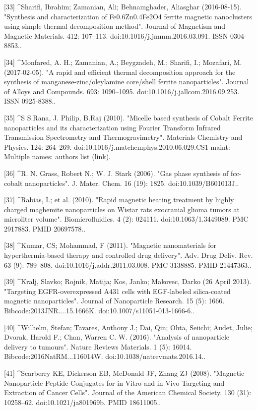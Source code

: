 [33]
^Sharifi, Ibrahim; Zamanian, Ali; Behnamghader, Aliasghar (2016-08-15). "Synthesis and characterization of Fe0.6Zn0.4Fe2O4 ferrite magnetic nanoclusters using simple thermal decomposition method". Journal of Magnetism and Magnetic Materials. 412: 107–113. doi:10.1016/j.jmmm.2016.03.091. ISSN 0304-8853..

[34]
^Monfared, A. H.; Zamanian, A.; Beygzadeh, M.; Sharifi, I.; Mozafari, M. (2017-02-05). "A rapid and efficient thermal decomposition approach for the synthesis of manganese-zinc/oleylamine core/shell ferrite nanoparticles". Journal of Alloys and Compounds. 693: 1090–1095. doi:10.1016/j.jallcom.2016.09.253. ISSN 0925-8388..

[35]
^S S.Rana, J. Philip, B.Raj (2010). "Micelle based synthesis of Cobalt Ferrite nanoparticles and its characterization using Fourier Transform Infrared Transmission Spectrometry and Thermogravimetry". Materials Chemistry and Physics. 124: 264–269. doi:10.1016/j.matchemphys.2010.06.029.CS1 maint: Multiple names: authors list (link).

[36]
^R. N. Grass, Robert N.; W. J. Stark (2006). "Gas phase synthesis of fcc-cobalt nanoparticles". J. Mater. Chem. 16 (19): 1825. doi:10.1039/B601013J..

[37]
^Rabias, I.; et al. (2010). "Rapid magnetic heating treatment by highly charged maghemite nanoparticles on Wistar rats exocranial glioma tumors at microliter volume". Biomicrofluidics. 4 (2): 024111. doi:10.1063/1.3449089. PMC 2917883. PMID 20697578..

[38]
^Kumar, CS; Mohammad, F (2011). "Magnetic nanomaterials for hyperthermia-based therapy and controlled drug delivery". Adv. Drug Deliv. Rev. 63 (9): 789–808. doi:10.1016/j.addr.2011.03.008. PMC 3138885. PMID 21447363..

[39]
^Kralj, Slavko; Rojnik, Matija; Kos, Janko; Makovec, Darko (26 April 2013). "Targeting EGFR-overexpressed A431 cells with EGF-labeled silica-coated magnetic nanoparticles". Journal of Nanoparticle Research. 15 (5): 1666. Bibcode:2013JNR....15.1666K. doi:10.1007/s11051-013-1666-6..

[40]
^Wilhelm, Stefan; Tavares, Anthony J.; Dai, Qin; Ohta, Seiichi; Audet, Julie; Dvorak, Harold F.; Chan, Warren C. W. (2016). "Analysis of nanoparticle delivery to tumours". Nature Reviews Materials. 1 (5): 16014. Bibcode:2016NatRM...116014W. doi:10.1038/natrevmats.2016.14..

[41]
^Scarberry KE, Dickerson EB, McDonald JF, Zhang ZJ (2008). "Magnetic Nanoparticle-Peptide Conjugates for in Vitro and in Vivo Targeting and Extraction of Cancer Cells". Journal of the American Chemical Society. 130 (31): 10258–62. doi:10.1021/ja801969b. PMID 18611005..

